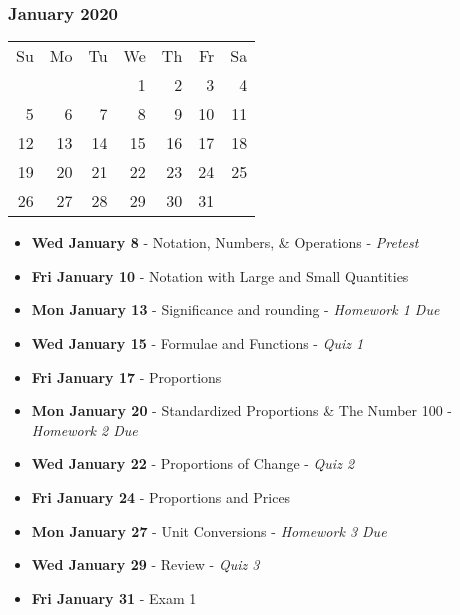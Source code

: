 \subsubsection*{January 2020}
\begin{tabular}{rrrrrrr}
Su & Mo & Tu & We & Th & Fr & Sa\\
   &    &    &  1 &  2 &  3 &  4\\ 
 5 &  6 &  7 &  8 &  9 & 10 & 11\\ 
12 & 13 & 14 & 15 & 16 & 17 & 18\\ 
19 & 20 & 21 & 22 & 23 & 24 & 25\\ 
26 & 27 & 28 & 29 & 30 & 31 &\\
\end{tabular}

\begin{itemize}
\item\textbf{Wed January  8}
  - Notation, Numbers, \& Operations - {\em Pretest}
\item\textbf{Fri January 10}
  - Notation with Large and Small Quantities
\item\textbf{Mon January 13}
  - Significance and rounding - {\em Homework 1 Due}
\item\textbf{Wed January 15}
  - Formulae and Functions - {\em Quiz 1}
\item\textbf{Fri January 17}
  - Proportions
\item\textbf{Mon January 20} 
  - Standardized Proportions \& The Number 100 - {\em Homework 2 Due}
\item\textbf{Wed January 22}
  - Proportions of Change - {\em Quiz 2}
\item\textbf{Fri January 24}
  - Proportions and Prices  
\item\textbf{Mon January 27}
  - Unit Conversions - {\em Homework 3 Due}
\item\textbf{Wed January 29}
  - Review - {\em Quiz 3}
\item\textbf{Fri January 31}
  - Exam 1
\end{itemize}
\hrulefill

